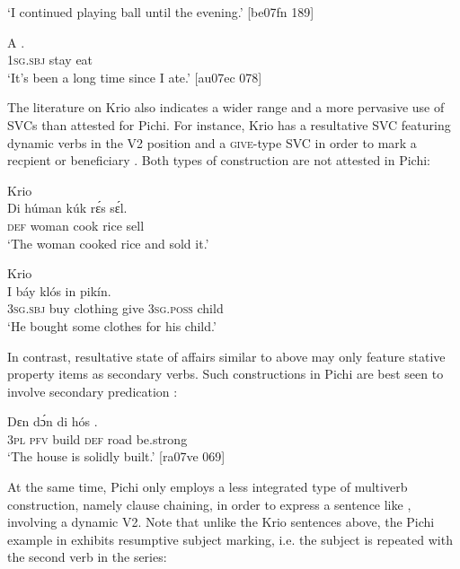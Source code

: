 \glt ‘I continued playing ball until the evening.’ [be07fn 189]
\z


\ea%
    \label{ex:key:17}
    \gll   A      .\\
\textsc{1sg.sbj}  stay    eat\\

\glt ‘It’s been a long time since I ate.’ [au07ec 078]
\z

The literature on Krio also indicates a wider range and a more pervasive use of SVCs than attested for Pichi. For instance, Krio has a resultative SVC featuring dynamic verbs in the V2 position  and a \textsc{give}{}-type SVC in order to mark a recpient or beneficiary . Both types of construction are not attested in Pichi:


\ea%
    \label{ex:key:18}
{{Krio}}{}{}\\
    \gll   Di  húman  kúk    rɛ́s    sɛ́l.                  \\
    \textsc{def}  woman  cook  rice    sell\\
\glt ‘The woman cooked rice and sold it.’ \citep[72]{Finney2004}
\z

\ea%
    \label{ex:key:19}
{{Krio}}{}{}\\
    \gll   I    báy    klós        in    pikín.\\
\textsc{3sg.sbj}  buy    clothing  give    \textsc{3sg.poss}  child\\

\glt ‘He bought some clothes for his child.’ \citep[72]{Finney2004}
\z

In contrast, resultative state of affairs similar to  above may only feature stative property items as secondary verbs. Such constructions in Pichi are best seen to involve secondary predication :


\ea%
    \label{ex:key:20}
    \gll   Dɛn    dɔ́n       di  hós    .\\
\textsc{3pl}    \textsc{pfv}    build  \textsc{def}  road    be.strong\\

\glt ‘The house is solidly built.’ [ra07ve 069]
\z

At the same time, Pichi only employs a less integrated type of multiverb construction, namely clause chaining, in order to express a sentence like , involving a dynamic V2. Note that unlike the Krio sentences above, the Pichi example in  exhibits resumptive subject marking, i.e. the subject is repeated with the second verb in the series: 


